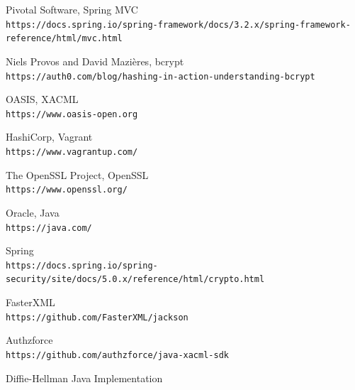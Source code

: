 \begin{thebibliography}{9}
Pivotal Software, Spring MVC
\\\texttt{https://docs.spring.io/spring-framework/docs/3.2.x/spring-framework-reference/html/mvc.html}

Niels Provos and David Mazières, bcrypt
\\\texttt{https://auth0.com/blog/hashing-in-action-understanding-bcrypt}

OASIS, XACML
\\\texttt{https://www.oasis-open.org}

HashiCorp, Vagrant
\\\texttt{https://www.vagrantup.com/}

The OpenSSL Project, OpenSSL
\\\texttt{https://www.openssl.org/}

Oracle, Java
\\\texttt{https://java.com/}

Spring
\\\texttt{https://docs.spring.io/spring-security/site/docs/5.0.x/reference/html/crypto.html}

FasterXML
\\\texttt{https://github.com/FasterXML/jackson}


Authzforce
\\\texttt{https://github.com/authzforce/java-xacml-sdk}

Diffie-Hellman Java Implementation
\\



\end{thebibliography}

